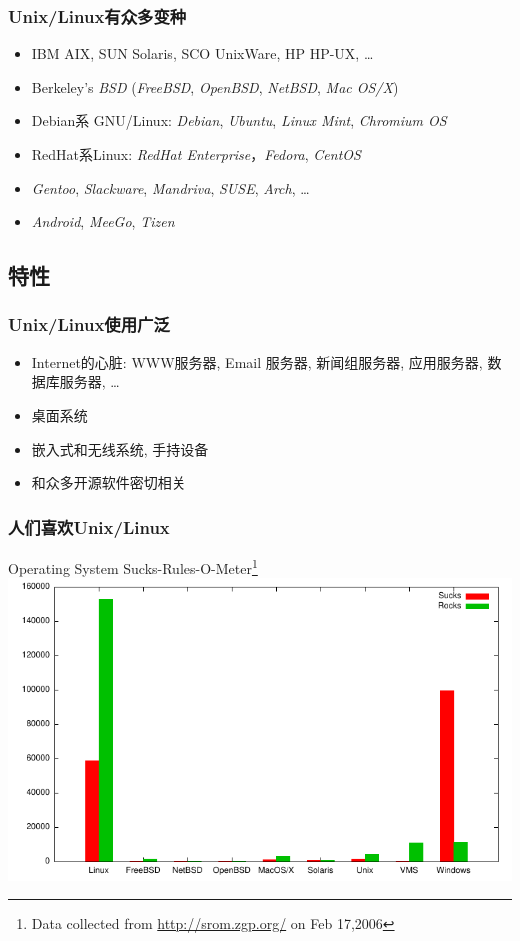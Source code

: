 \documentclass[compress]{beamer}
\begin{document}
\begin{frame}
\frametitle{Unix/Linux有众多变种}
\begin{itemize}
    \item IBM AIX, SUN Solaris, SCO UnixWare, HP HP-UX, \dots
    \item Berkeley's \emph{BSD} (\emph{FreeBSD}, \emph{OpenBSD}, \emph{NetBSD}, \emph{Mac OS/X})
    \item Debian系 GNU/Linux: \emph{Debian}, \emph{Ubuntu}, \emph{Linux Mint},
        \emph{Chromium OS}
    \item RedHat系Linux: \emph{RedHat Enterprise}，\emph{Fedora},
        \emph{CentOS}
    \item \emph{Gentoo}, \emph{Slackware}, \emph{Mandriva}, \emph{SUSE},
        \emph{Arch}, \ldots
    \item \emph{Android}, \emph{MeeGo}, \emph{Tizen}
\end{itemize}
\end{frame}

\subsection{特性}

\begin{frame}
\frametitle{Unix/Linux使用广泛}
\begin{itemize}
	\item Internet的心脏: WWW服务器, Email 服务器, 新闻组服务器, 应用服务器,
			数据库服务器, \dots
	\item 桌面系统
	\item 嵌入式和无线系统, 手持设备
	\item 和众多开源软件密切相关
\end{itemize}
\end{frame}

\begin{frame}
\frametitle{人们喜欢Unix/Linux}
Operating System Sucks-Rules-O-Meter\footnote{Data collected from
\href{http://srom.zgp.org/}{http://srom.zgp.org/} on Feb 17,2006}
\includegraphics[width=0.8\hsize]{sucks_rocks.pdf}
\end{frame}
\end{document}

